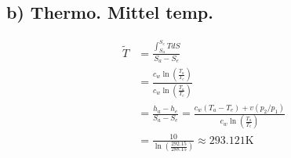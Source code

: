 \subsection*{b) Thermo. Mittel temp.}
\begin{align*}
\tilde{T} &= \frac{\int_{S_a}^{S_e} T dS}{S_a - S_e} \\
&= \frac{c_w \ln \left( \frac{T_a}{T_e} \right)}{c_w \ln \left( \frac{T_a}{T_e} \right)} \\
&= \frac{h_a - h_e}{S_a - S_e} = \frac{c_w (T_a - T_e) + v (p_2 / p_1)}{c_w \ln \left( \frac{T_a}{T_e} \right)} \\
&= \frac{10}{\ln \left( \frac{292.15}{288.15} \right)} \approx 293.121 \text{K}
\end{align*}